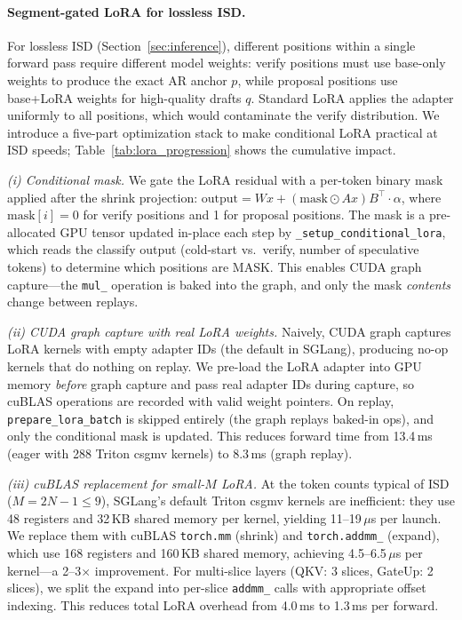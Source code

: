 \paragraph{Segment-gated LoRA for lossless ISD.}
For lossless ISD (Section~\ref{sec:inference}), different positions within a single forward pass require different model weights: verify positions must use base-only weights to produce the exact AR anchor $p$, while proposal positions use base+LoRA weights for high-quality drafts $q$. Standard LoRA applies the adapter uniformly to all positions, which would contaminate the verify distribution. We introduce a five-part optimization stack to make conditional LoRA practical at ISD speeds; Table~\ref{tab:lora_progression} shows the cumulative impact.

\emph{(i) Conditional mask.} We gate the LoRA residual with a per-token binary mask applied after the shrink projection: $\text{output} = Wx + (\text{mask} \odot Ax) B^\top \cdot \alpha$, where $\text{mask}[i] = 0$ for verify positions and 1 for proposal positions. The mask is a pre-allocated GPU tensor updated in-place each step by \texttt{\_setup\_conditional\_lora}, which reads the classify output (cold-start vs.\ verify, number of speculative tokens) to determine which positions are MASK. This enables CUDA graph capture---the \texttt{mul\_} operation is baked into the graph, and only the mask \emph{contents} change between replays.

\emph{(ii) CUDA graph capture with real LoRA weights.} Naively, CUDA graph captures LoRA kernels with empty adapter IDs (the default in SGLang), producing no-op kernels that do nothing on replay. We pre-load the LoRA adapter into GPU memory \emph{before} graph capture and pass real adapter IDs during capture, so cuBLAS operations are recorded with valid weight pointers. On replay, \texttt{prepare\_lora\_batch} is skipped entirely (the graph replays baked-in ops), and only the conditional mask is updated. This reduces forward time from 13.4\,ms (eager with 288 Triton csgmv kernels) to 8.3\,ms (graph replay).

\emph{(iii) cuBLAS replacement for small-$M$ LoRA.} At the token counts typical of ISD ($M = 2N{-}1 \leq 9$), SGLang's default Triton csgmv kernels are inefficient: they use 48 registers and 32\,KB shared memory per kernel, yielding 11--19\,$\mu$s per launch. We replace them with cuBLAS \texttt{torch.mm} (shrink) and \texttt{torch.addmm\_} (expand), which use 168 registers and 160\,KB shared memory, achieving 4.5--6.5\,$\mu$s per kernel---a 2--3$\times$ improvement. For multi-slice layers (QKV: 3 slices, GateUp: 2 slices), we split the expand into per-slice \texttt{addmm\_} calls with appropriate offset indexing. This reduces total LoRA overhead from 4.0\,ms to 1.3\,ms per forward.

